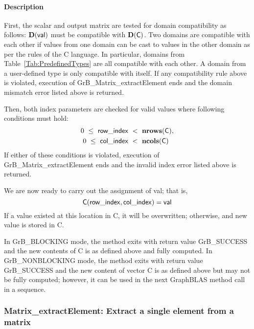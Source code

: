 \paragraph{Description}

First, the scalar and output matrix are tested for domain compatibility as follows:  
$\mathbf{D}({\sf val})$ must be compatible with $\mathbf{D}({\sf C})$. Two domains 
are compatible with each other if values from one domain can be cast to values 
in the other domain as per the rules of the C language.  In particular, domains 
from Table~\ref{Tab:PredefinedTypes} are all compatible with each other. A domain 
from a user-defined type is only compatible with itself.  If any compatibility 
rule above is violated, execution of {\sf GrB\_Matrix\_extractElement} ends and
the domain mismatch error listed above is returned.

Then, both index parameters are checked for valid values where following
conditions must hold:
\[
\begin{aligned}
    0\ \leq\ {\sf row\_index} & \ <\ \mathbf{nrows}({\sf C}), \\
    0\ \leq\ {\sf col\_index} & \ <\ \mathbf{ncols}({\sf C})
\end{aligned}
\]
If either of these conditions is violated, execution of 
{\sf GrB\_Matrix\_extractElement} ends and the invalid 
index error listed above is returned. 

We are now ready to carry out the assignment of {\sf val}; that is,
\[
{\sf C}({\sf row\_index},{\sf col\_index}) = {\sf val} 
\]
If a value existed at this location in {\sf C}, it will be overwritten; otherwise,
and new value is stored in {\sf C}.

In {\sf GrB\_BLOCKING} mode, the method exits with return value 
{\sf GrB\_SUCCESS} and the new contents of {\sf C} is as defined above
and fully computed.  
In {\sf GrB\_NONBLOCKING} mode, the method exits with return value 
{\sf GrB\_SUCCESS} and the new content of vector {\sf C} is as defined above 
but may not be fully computed; however, it can be used in the next GraphBLAS 
method call in a sequence.



\subsubsection{{\sf Matrix\_extractElement}: Extract a single element from a matrix}
\label{Sec:extract_single_element_mat}

